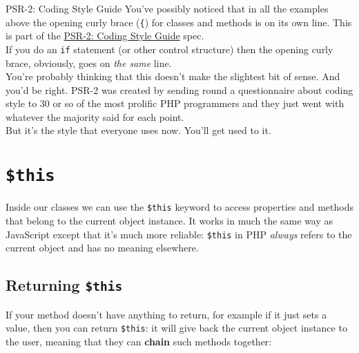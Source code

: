 \begin{infobox}{PSR-2: Coding Style Guide}
    You've possibly noticed that in all the examples above the opening curly brace (\texttt{\{}) for classes and methods is on its own line. This is part of the \href{https://www.php-fig.org/psr/psr-2/}{PSR-2: Coding Style Guide} spec.
    \\

    If you do an \texttt{if} statement (or other control structure) then the opening curly brace, obviously, goes on \textit{the same} line.
    \\

    You're probably thinking that this doesn't make the slightest bit of sense. And you'd be right. PSR-2 was created by sending round a questionnaire about coding style to 30 or so of the most prolific PHP programmers and they just went with whatever the majority said for each point.
    \\

    But it's the style that everyone uses now. You'll get used to it.
\end{infobox}


\section{\texttt{\$this}}

Inside our classes we can use the \texttt{\$this} keyword to access properties and methods that belong to the current object instance. It works in much the same way as JavaScript except that it's much more reliable: \texttt{\$this} in PHP \textit{always} refers to the current object and has no meaning elsewhere.



\subsection{Returning \texttt{\$this}}

If your method doesn't have anything to return, for example if it just sets a value, then you can return \texttt{\$this}: it will give back the current object instance to the user, meaning that they can \textbf{chain} such methods together:



